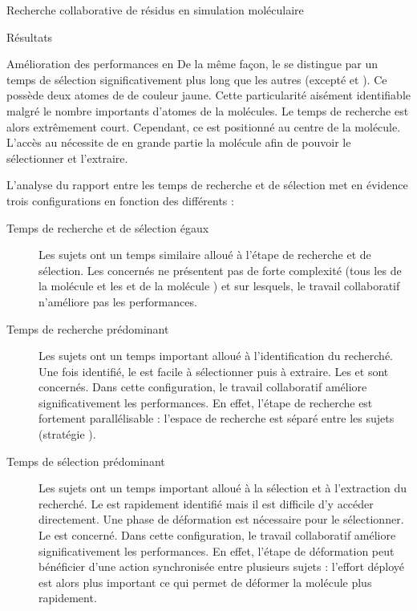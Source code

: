 \documentclass[myfrancais]{mythesis}
\begin{document}
\begin{mychapter}{Recherche collaborative de résidus en simulation moléculaire}
\begin{mysection}{Résultats}
\begin{mysubsection}{Amélioration des performances en }
				De la même façon, le   se distingue par un temps de sélection significativement plus long que les autres  (excepté  et ).
				Ce  possède deux atomes de  de couleur jaune.
				Cette particularité aisément identifiable malgré le nombre importants d'atomes de la molécules.
				Le temps de recherche est alors extrêmement court.
				Cependant, ce  est positionné au centre de la molécule.
				L'accès au  nécessite de  en grande partie la molécule afin de pouvoir le sélectionner et l'extraire.

				L'analyse du rapport entre les temps de recherche et de sélection met en évidence trois configurations en fonction des différents  :
				\begin{description}
					\item[Temps de recherche et de sélection égaux]
						Les sujets ont un temps similaire alloué à l'étape de recherche et de sélection.
						Les  concernés ne présentent pas de forte complexité (tous les  de la molécule \myTRPCAGE et les   et  de la molécule \myPrion) et sur lesquels, le travail collaboratif n'améliore pas les performances.
					\item[Temps de recherche prédominant]
						Les sujets ont un temps important alloué à l'identification du  recherché.
						Une fois identifié, le  est facile à sélectionner puis à extraire.
						Les   et  sont concernés.
						Dans cette configuration, le travail collaboratif améliore significativement les performances.
						En effet, l'étape de recherche est fortement parallélisable : l'espace de recherche est séparé entre les sujets (stratégie ).
					\item[Temps de sélection prédominant]
						Les sujets ont un temps important alloué à la sélection et à l'extraction du  recherché.
						Le  est rapidement identifié mais il est difficile d'y accéder directement.
						Une phase de déformation est nécessaire pour le sélectionner.
						Le   est concerné.
						Dans cette configuration, le travail collaboratif améliore significativement les performances.
						En effet, l'étape de déformation peut bénéficier d'une action synchronisée entre plusieurs sujets : l'effort déployé est alors plus important ce qui permet de déformer la molécule plus rapidement.

\end{description}
\end{mysubsection}
\end{mysection}
\end{mychapter}
\end{document}
